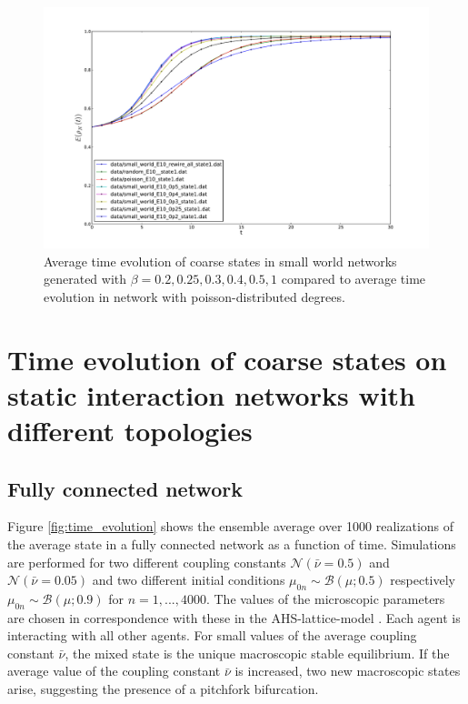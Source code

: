 \documentclass[]{article}
\title{}
\author{}
\begin{document}




\begin{figure}[H]


\includegraphics[width=1.1\textwidth]{time_evolution_rewiring_probability_dependency.pdf}
\caption{Average time evolution of coarse states in small world networks generated with $\beta=0.2, 0.25, 0.3, 0.4, 0.5, 1$ compared to average time evolution in  network with poisson-distributed degrees.}
\label{fig:time_evolution_beta}
\end{figure}



\section{Time evolution of coarse states on static interaction networks with different topologies}
\subsection{Fully connected network}

Figure \ref{fig:time_evolution} shows the ensemble average over 1000 realizations of the average state in a fully connected network as a function of time. Simulations are performed for two different coupling constants $\mathcal{N}(\bar{\nu}=0.5)$ and  $\mathcal{N}(\bar{\nu}=0.05)$ and two different initial conditions $ \mu_{0 n} \sim \mathcal{B} ( \mu; 0.5) $ respectively $ \mu_{0n} \sim\mathcal{B} ( \mu; 0.9 ) $ for $n=1,...,4000$.     %
 The values of the microscopic parameters are chosen in correspondence with these in the AHS-lattice-model \cite{avitabile14}. Each agent is interacting with all other agents. For small values of the average coupling constant $\bar{\nu}$, the mixed state is the unique macroscopic stable equilibrium.  If the average value of the coupling constant $\bar{\nu}$ is increased, two new macroscopic states arise, suggesting the presence of a pitchfork bifurcation. 
\end{document}
